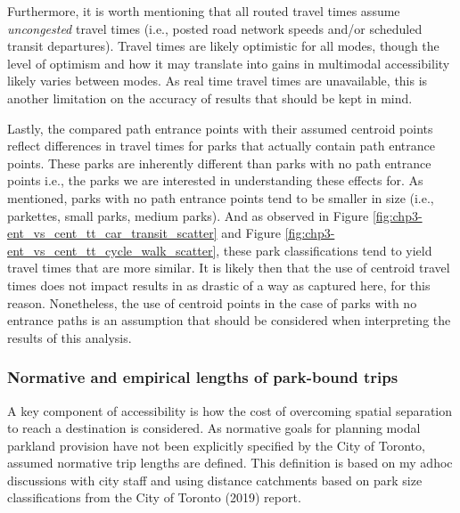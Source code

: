 \documentclass[
11pt, %
oneside, %
english, %
singlespacing, %
]{macthesis} %
\begin{document}
Furthermore, it is worth mentioning that all routed travel times assume \emph{uncongested} travel times (i.e., posted road network speeds and/or scheduled transit departures). Travel times are likely optimistic for all modes, though the level of optimism and how it may translate into gains in multimodal accessibility likely varies between modes. As real time travel times are unavailable, this is another limitation on the accuracy of results that should be kept in mind.

Lastly, the compared path entrance points with their assumed centroid points reflect differences in travel times for parks that actually contain path entrance points. These parks are inherently different than parks with no path entrance points i.e., the parks we are interested in understanding these effects for. As mentioned, parks with no path entrance points tend to be smaller in size (i.e., parkettes, small parks, medium parks). And as observed in Figure \ref{fig:chp3-ent_vs_cent_tt_car_transit_scatter} and Figure \ref{fig:chp3-ent_vs_cent_tt_cycle_walk_scatter}, these park classifications tend to yield travel times that are more similar. It is likely then that the use of centroid travel times does not impact results in as drastic of a way as captured here, for this reason. Nonetheless, the use of centroid points in the case of parks with no entrance paths is an assumption that should be considered when interpreting the results of this analysis.

\subsubsection{Normative and empirical lengths of park-bound trips}\label{normative-and-empirical-lengths-of-park-bound-trips}

A key component of accessibility is how the cost of overcoming spatial separation to reach a destination is considered. As normative goals for planning modal parkland provision have not been explicitly specified by the City of Toronto, assumed normative trip lengths are defined. This definition is based on my adhoc discussions with city staff and using distance catchments based on park size classifications from the City of Toronto (2019) report.
\end{document}
